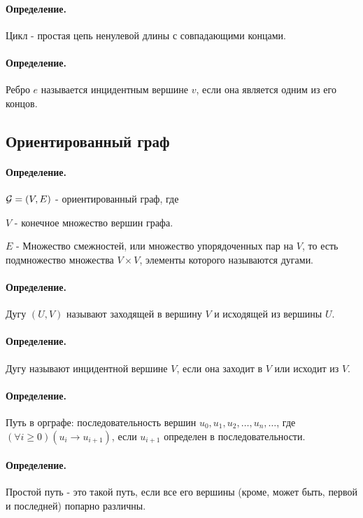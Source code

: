 \documentclass{report}
\begin{document}
 \paragraph*{Определение.}
 Цикл - простая цепь ненулевой длины с совпадающими концами.

\paragraph*{Определение.}
Ребро $e$ называется инцидентным вершине  $v$, если она является одним из его концов.


\subsection{Ориентированный граф}

\paragraph*{Определение.}
$ {\cal G} = (V, E)$ - ориентированный граф, где

$V$ - конечное множество вершин графа.

 $E$ - Множество смежностей, или множество упорядоченных пар на  $V$, то есть подмножество
 множества  $V \times V$, элементы которого называются дугами.

  \paragraph*{Определение.}
 Дугу $(U, V)$ называют заходящей в вершину  $V$ и исходящей из вершины  $U$.

\paragraph*{Определение.}
Дугу называют инцидентной вершине $V$, если она заходит в  $V$ или исходит из $V$.

 \paragraph*{Определение.}
Путь в орграфе: последовательность вершин $u_0, u_1, u_2,\ldots,u_n,\ldots$, где $(\forall i \ge  0)
(u_i \to u_{i+1})$, если $u_{i+1}$ определен в последовательности.

\paragraph*{Определение.}
Простой путь - это такой путь, если все его вершины (кроме, может быть, первой и последней)
попарно различны.
\end{document}
